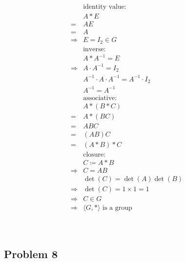 \documentclass{article}
\begin{document}
\begin{equation*}
    \begin{split}
        &\text{identity value}:\\
        &A*E\\
        =&AE\\
        =&A\\
        \Rightarrow&E=I_2\in G\\
        &\text{inverse}:\\
        &A*A^{-1}=E\\
        \Rightarrow&A\cdot A^{-1}=I_2\\
        &A^{-1}\cdot A \cdot A^{-1}=A^{-1}\cdot I_2\\
        &A^{-1}=A^{-1}\\
        &\text{associative}:\\
        &A*(B*C)\\
        =&A*(BC)\\
        =&ABC\\
        =&(AB)C\\
        =&(A*B)*C\\
        &\text{closure}:\\
        &C\coloneqq A*B\\
        \Rightarrow&C=AB\\
        &\det(C)=\det(A)\det(B)\\
        \Rightarrow&\det(C)=1\times 1=1\\
        \Rightarrow&C\in G\\
        \Rightarrow&\langle G,*\rangle\text{ is a group}\\
    \end{split}
\end{equation*}

~

\subsection*{Problem 8}

~
\end{document}
